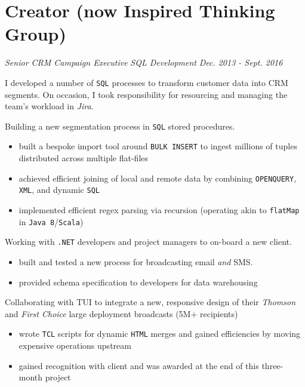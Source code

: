 \documentclass[letterpaper,11pt]{article}
\begin{document}
\section{Creator (now Inspired Thinking Group)}
\textit{Senior CRM Campaign Executive}
\hfill
\textit{SQL Development}
\hfill
\textit{Dec. 2013 - Sept. 2016}
\begin{paragraph}
	I developed a number of \texttt{SQL} processes to transform customer data into CRM segments.  On occasion, I took responsibility for resourcing and managing the team's workload in \textit{Jira}.
\end{paragraph}
\begin{description}[style=multiline,leftmargin=3cm]
	\item[Virgin Media Segmentation \tiny\textnormal{\href{https://adrian.ng/SQL/recursion}{adrian.ng/SQL/recursion}} \textnormal{\href{https://adrian.ng/openquery-xml}{adrian.ng/openquery-xml}}]
	      Building a new segmentation process in \texttt{SQL} stored procedures.
	      \begin{itemize}
		      \item built a bespoke import tool around \texttt{BULK INSERT} to ingest millions of tuples distributed across multiple flat-files
		      \item achieved efficient joining of local and remote data by  combining \texttt{OPENQUERY}, \texttt{XML}, and dynamic \texttt{SQL}
		      \item implemented efficient regex parsing via recursion (operating akin to \texttt{flatMap} in \texttt{Java 8}/\texttt{Scala})
	      \end{itemize}
	\item[Volkswagen Onboarding]
	      Working with \texttt{.NET} developers and project managers to on-board a new client.
	      \begin{itemize}
		      \item built and tested a new process for broadcasting email \textit{and} SMS.
		      \item provided schema specification to developers for data warehousing
	      \end{itemize}
	\item[TUI Redesign]
	      Collaborating with TUI to integrate a new, responsive design of their \textit{Thomson} and \textit{First Choice} large deployment broadcasts (5M+ recipients)
	      \begin{itemize}
		      \item wrote \texttt{TCL} scripts for dynamic \texttt{HTML} merges and gained efficiencies by moving expensive operations upstream
		      \item gained recognition with client and was awarded at the end of this three-month project
	      \end{itemize}
\end{description}
\end{document}
